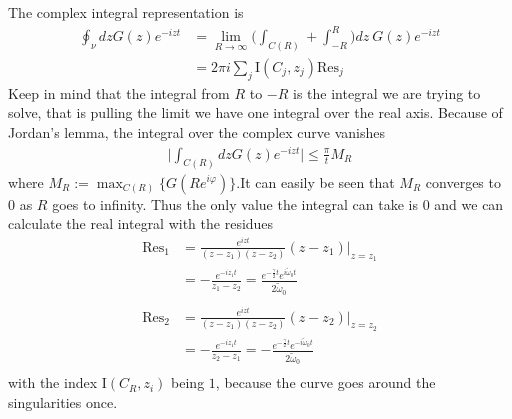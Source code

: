 \documentclass[a4paper]{article}
\begin{document}
\begin{center}
\end{center}

The complex integral representation is
\begin{align}
    \oint_\nu dz G(z) e^{-izt} &=
     \lim_{R \rightarrow \infty }
     \bigg(
    \int_{C(R)} + \int_{-R}^{R}
    \bigg)
    dz\ G(z) e^{-izt}\\
    &= 2\pi i\sum_j \text{I}(C_j, z_j) \text{Res}_j
\end{align}
Keep in mind that the integral from $R$ to $-R$ is the integral we are
trying to solve, that is pulling the limit we have one integral over the real
axis. Because of Jordan's lemma, the integral over the complex curve vanishes
\begin{align}
    \big| \int_{C(R)} dz G(z) e^{-izt}\big| \leq \frac{\pi}{t}M_R
\end{align}
where $M_R:= \max_{C(R)}\{G(Re^{i\varphi})\}$.It can easily be seen that $M_R$
converges to $0$ as $R$ goes to infinity. Thus the only value the integral can
take is $0$ and we can calculate the real integral with the residues
\begin{align}
    \text{Res}_1 &= \frac{e^{i z t}}{(z - z_1)(z - z_2)} (z - z_1)\bigg|_{z=z_1}
    \\
    &= -\frac{e^{-iz_1t}}{z_1 - z_2} = \frac{e^{-\frac{\gamma}{2}t}
    e^{i\tilde{\omega}_0 t}}{2\tilde{\omega}_0}\\
    \nonumber \\
    \text{Res}_2 &= \frac{e^{i z t}}{(z - z_1)(z - z_2)} (z - z_2)\bigg|_{z=z_2}
    \\
    &= -\frac{e^{-iz_1t}}{z_2 - z_1} = -\frac{e^{-\frac{\gamma}{2}t}
    e^{-i\tilde{\omega}_0 t}}{2\tilde{\omega}_0}\\
\end{align}
with the index $\text{I}(C_R, z_i)$ being $1$, because the curve goes around the
singularities once.
\end{document}
